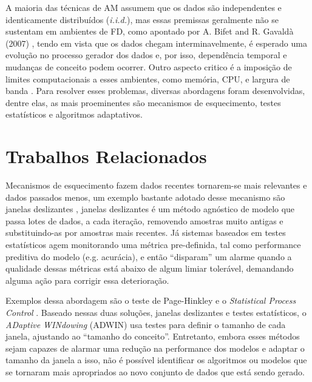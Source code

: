 A maioria das técnicas de AM assumem que os dados são independentes e
identicamente distribuídos (\textit{i.i.d.}), mas essas premissas geralmente não
se sustentam em ambientes de FD, como apontado por A. Bifet and R.
Gavald\`a (2007) \cite{bifet2007learning}, tendo em vista que os dados chegam
interminavelmente, é esperado uma evolução no processo gerador dos dados e, por isso, dependência temporal e mudanças de conceito podem ocorrer.  Outro aspecto critico é a imposição de limites
computacionais a esses ambientes, como memória, CPU, e largura de banda
\cite{bifet2010moa, gama2012survey}. Para resolver esses problemas, diversas
abordagens foram desenvolvidas, dentre elas, as mais proeminentes são
mecanismos de esquecimento, testes estatísticos e algoritmos adaptativos.

\section{Trabalhos Relacionados}



Mecanismos de esquecimento fazem dados recentes tornarem-se mais relevantes e
dados passados menos, um exemplo bastante adotado desse mecanismo são janelas deslizantes
\cite{gaber2005mining}, janelas deslizantes é um método agnóstico de modelo que passa lotes de dados, a cada iteração, removendo amostras muito antigas e substituindo-as por amostras mais recentes. Já sistemas baseados em testes estatísticos agem monitorando uma métrica
pre-definida, tal como performance preditiva do modelo (e.g. acurácia), e então ``disparam'' um
alarme quando a qualidade dessas métricas está abaixo de algum limiar
tolerável, demandando alguma ação para corrigir essa deterioração.

Exemplos dessa abordagem são o teste de Page-Hinkley e o \textit{Statistical
Process Control} \cite{gama2010knowledge}.
Baseado nessas duas soluções, janelas deslizantes e testes estatísticos, o \textit{ADaptive WINdowing} (ADWIN) \cite{bifet2007learning} usa testes para definir o tamanho de cada janela, ajustando ao ``tamanho do conceito''.
Entretanto, embora esses métodos sejam capazes de alarmar uma redução na performance dos modelos e adaptar o tamanho da janela a isso, não é possível identificar os algoritmos ou modelos que se tornaram mais apropriados ao novo conjunto de dados que está sendo gerado.

